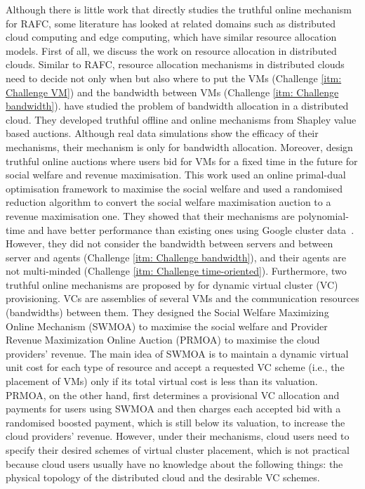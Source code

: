 \documentclass[11pt]{phdthesis}
\begin{document}
Although there is little work that directly studies the truthful online mechanism for RAFC, some literature has looked at related domains such as distributed cloud computing and edge computing, which have similar resource allocation models. First of all, we discuss the work on resource allocation in distributed clouds. Similar to RAFC, resource allocation mechanisms in distributed clouds need to decide not only when but also where to put the VMs (Challenge \ref{itm: Challenge VM}) and the bandwidth between VMs (Challenge \ref{itm: Challenge bandwidth}). \citet{shi2015shapley} have studied the problem of bandwidth allocation in a distributed cloud. They developed truthful offline and online mechanisms from Shapley value based auctions. Although real data simulations show the efficacy of their mechanisms, their mechanism is only for bandwidth allocation. Moreover, \citet{zhang2015online} design truthful online auctions where users bid for VMs for a fixed time in the future for social welfare and revenue maximisation. This work used an online primal-dual optimisation framework to maximise the social welfare and used a randomised reduction algorithm to convert the social welfare maximisation auction to a revenue maximisation one. They showed that their mechanisms are polynomial-time and have better performance than existing ones using Google cluster data~\citep{reiss2011google}. However, they did not consider the bandwidth between servers and between server and agents (Challenge \ref{itm: Challenge bandwidth}), and their agents are not multi-minded (Challenge \ref{itm: Challenge time-oriented}). Furthermore, two truthful online mechanisms are proposed by \citet{shi2017online} for dynamic virtual cluster (VC) provisioning. VCs are assemblies of several VMs and the communication resources (bandwidths) between them. They designed the Social Welfare Maximizing Online Mechanism (SWMOA) to maximise the social welfare and Provider Revenue Maximization Online Auction (PRMOA) to maximise the cloud providers' revenue. The main idea of SWMOA is to maintain a dynamic virtual unit cost for each type of resource and accept a requested VC scheme (i.e., the placement of VMs) only if its total virtual cost is less than its valuation. PRMOA, on the other hand, first determines a provisional VC allocation and payments for users using SWMOA and then charges each accepted bid with a randomised boosted payment, which is still below its valuation, to increase the cloud providers' revenue. However, under their mechanisms, cloud users need to specify their desired schemes of virtual cluster placement, which is not practical because cloud users usually have no knowledge about the following things: the physical topology of the distributed cloud and the desirable VC schemes. 
\end{document}
